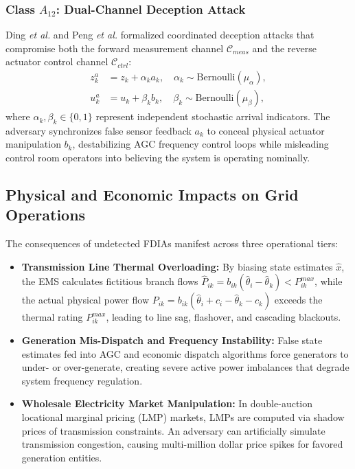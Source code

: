 \documentclass[journal,compsoc]{IEEEtran}
\begin{document}
\subsubsection{Class $A_{12}$: Dual-Channel Deception Attack \cite{ref16, ref17, ref60}}
Ding \textit{et al.} \cite{ref16} and Peng \textit{et al.} \cite{ref17} formalized coordinated deception attacks that compromise both the forward measurement channel $\mathcal{C}_{meas}$ and the reverse actuator control channel $\mathcal{C}_{ctrl}$:
\begin{align}
    z_k^a &= z_k + \alpha_k a_k, \quad \alpha_k \sim \text{Bernoulli}(\mu_\alpha), \\
    u_k^a &= u_k + \beta_k b_k, \quad \beta_k \sim \text{Bernoulli}(\mu_\beta),
\end{align}
where $\alpha_k, \beta_k \in \{0, 1\}$ represent independent stochastic arrival indicators. The adversary synchronizes false sensor feedback $a_k$ to conceal physical actuator manipulation $b_k$, destabilizing AGC frequency control loops while misleading control room operators into believing the system is operating nominally.

\subsection{Physical and Economic Impacts on Grid Operations}
The consequences of undetected FDIAs manifest across three operational tiers:
\begin{itemize}
    \item \textbf{Transmission Line Thermal Overloading:} By biasing state estimates $\hat{x}$, the EMS calculates fictitious branch flows $\hat{P}_{ik} = b_{ik}(\hat{\theta}_i - \hat{\theta}_k) < P_{ik}^{max}$, while the actual physical power flow $P_{ik} = b_{ik}(\hat{\theta}_i + c_i - \hat{\theta}_k - c_k)$ exceeds the thermal rating $P_{ik}^{max}$, leading to line sag, flashover, and cascading blackouts.
    \item \textbf{Generation Mis-Dispatch and Frequency Instability:} False state estimates fed into AGC and economic dispatch algorithms force generators to under- or over-generate, creating severe active power imbalances that degrade system frequency regulation.
    \item \textbf{Wholesale Electricity Market Manipulation:} In double-auction locational marginal pricing (LMP) markets, LMPs are computed via shadow prices of transmission constraints. An adversary can artificially simulate transmission congestion, causing multi-million dollar price spikes for favored generation entities.
\end{itemize}
\end{document}
